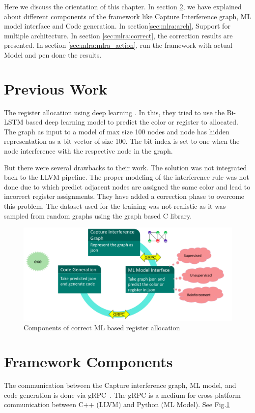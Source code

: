 Here we discuss the orientation of this chapter. In section \ref{sec:mlra:components}, we have explained about different components of the framework like  Capture Interference graph, ML model interface and Code generation. In section\ref{sec:mlra:arch}, Support for multiple architecture. In section \ref{sec:mlra:correct}, the correction results are presented. In section \ref{sec:mlra:mlra_action}, run the framework with actual Model and pen done the results.


\section{Previous Work}
The register allocation using deep learning \cite{dlra:LLVMHPC_2020}. In this, they tried to use the Bi-LSTM based deep learning model to predict the color or register to allocated. The graph as input to a model of max size 100 nodes and node has hidden representation as a bit vector of size 100. The bit index is set to one when the node interference with the respective node in the graph. 

But there were several drawbacks to their work. The solution was not integrated back to the LLVM pipeline. The proper modeling of the interference rule was not done due to which predict adjacent nodes are assigned the same color and lead to incorrect register assignments. They have added a correction phase to overcome this problem. The dataset used for the training was not realistic as it was sampled from random graphs using the graph based C library.

\begin{figure}[t]
    \centering
    \includegraphics[scale=0.4]{figures/chapter-5/mlra_components.png}
    \caption{Components of correct ML based register allocation}
     \label{fig:mlra-components}
\end{figure}

\section{Framework Components}\label{sec:mlra:components}
The communication between the Capture interference graph, ML model, and code generation is done via gRPC~\cite{grpc}. The gRPC is a medium for cross-platform communication between C++ (LLVM) and Python (ML Model). See Fig.\ref{fig:mlra-components}
